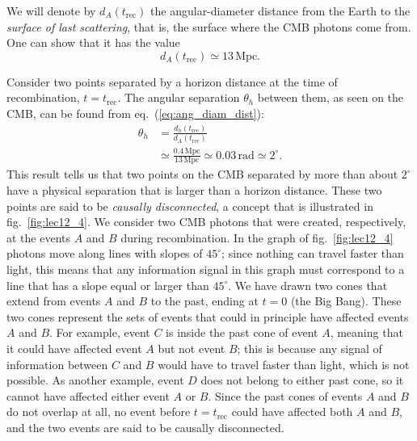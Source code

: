 We will denote by $d_A(t_{\mathrm{rec}})$ the angular-diameter distance from the Earth to the {\it surface of last scattering}, that is, the surface where the CMB photons come from. One can show that it has the value
\begin{equation}
d_A(t_{\mathrm{rec}})\simeq 13\,{\mathrm{Mpc}}.
\end{equation}

Consider two points separated by a horizon distance at the time of recombination, $t=t_{\mathrm{rec}}$. The angular separation $\theta_h$ between them, as seen on the CMB, can be found from eq.\ (\ref{eq:ang_diam_dist}):
\begin{equation} \label{eq:horizon_prob1}
\begin{split}
\theta_h&=\frac{d_h(t_{\mathrm{rec}})}{d_A(t_{\mathrm{rec}})}\\
&\simeq \frac{0.4\,{\mathrm{Mpc}}}{13\,{\mathrm{Mpc}}}\simeq 0.03\,{\mathrm{rad}}\simeq 2^{\circ}.
\end{split}
\end{equation}
This result tells us that two points on the CMB separated by more than about $2^{\circ}$ have a physical separation that is larger than a horizon distance. These two points are said to be {\it causally disconnected}, a concept that is illustrated in fig.\ \ref{fig:lec12_4}. We consider two CMB photons that were created, respectively, at the events $A$ and $B$ during recombination. In the graph of fig.\ \ref{fig:lec12_4} photons move along lines with slopes of $45^{\circ}$; since nothing can travel faster than light, this means that any information signal in this graph must correspond to a line that has a slope equal or larger than $45^{\circ}$. We have drawn two cones that extend from events $A$ and $B$ to the past, ending at $t=0$ (the Big Bang). These two cones represent the sets of events that could in principle have affected events $A$ and $B$. For example, event $C$ is inside the past cone of event $A$, meaning that it could have affected event $A$ but not event $B$; this is because any signal of information between $C$ and $B$ would have to travel faster than light, which is not possible. As another example, event $D$ does not belong to either past cone, so it cannot have affected either event $A$ or $B$. Since the past cones of events $A$ and $B$ do not overlap at all, no event before $t=t_{\mathrm{rec}}$ could have affected both $A$ and $B$, and the two events are said to be causally disconnected.
